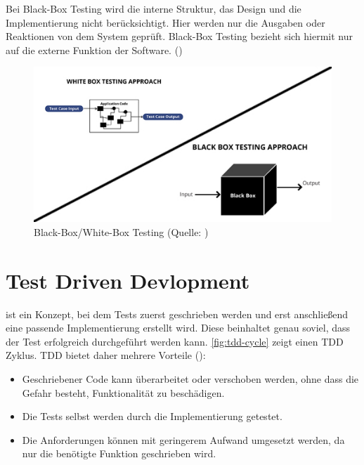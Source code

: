 \documentclass[a4paper, fontsize=11pt, parskip=half, twoside]{scrreprt}
\begin{document}
	Bei Black-Box Testing wird die interne Struktur, das Design und die Implementierung nicht berücksichtigt.
	Hier werden nur die Ausgaben oder Reaktionen von dem System geprüft.
	Black-Box Testing bezieht sich hiermit nur auf die externe Funktion der Software. (\textcite[Seite 12]{nidhra_black_2012})
	
	\begin{figure}[ht]
		\centering
		\includegraphics[scale=0.6]{assets/WhiteBoxBlackBoxTesting.jpg}
		\caption{Black-Box/White-Box Testing (Quelle: \textcite{khandelwal_difference_2019})}
		\label{fig:WhiteBoxBlackBoxTesting}
	\end{figure}
	
	
	\section{Test Driven Devlopment}
	 ist ein Konzept, bei dem Tests zuerst geschrieben werden und erst anschließend eine passende Implementierung erstellt wird.
	Diese beinhaltet genau soviel, dass der Test erfolgreich durchgeführt werden kann.
	\autoref{fig:tdd-cycle} zeigt einen \ac{TDD} Zyklus.
	\ac{TDD} bietet daher mehrere Vorteile (\textcite{ammann_introduction_2016}):
	
	\begin{itemize}
		\item Geschriebener Code kann überarbeitet oder verschoben werden, ohne dass die Gefahr besteht, Funktionalität zu beschädigen.
		\item Die Tests selbst werden durch die Implementierung getestet.
		\item Die Anforderungen können mit geringerem Aufwand umgesetzt werden, da nur die benötigte Funktion geschrieben wird.
	\end{itemize}
	
\end{document}

